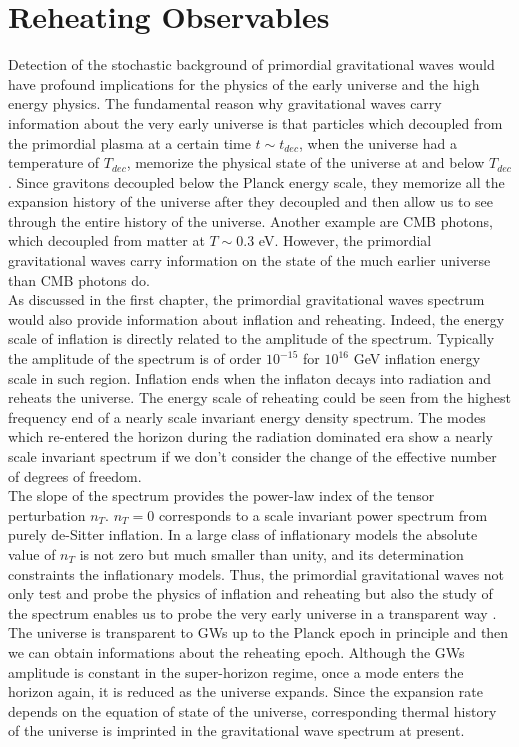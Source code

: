 \documentclass[11pt,a4paper,twoside]{book}
\begin{document}
\chapter{Reheating Observables}
Detection of the stochastic background of primordial gravitational waves would have profound implications for the physics of the early universe and the high energy physics. The fundamental reason why gravitational waves carry information about the very early universe is that particles which decoupled from the primordial plasma at a certain time $ t\sim t_{dec} $, when the universe had a temperature of $ T_{dec} $, memorize the physical state of the universe at and below $ T_{dec} $. Since gravitons decoupled below the Planck energy scale, they memorize all the expansion history of the universe after they decoupled and then allow us to see through the entire history of the universe. Another example are CMB photons, which decoupled from matter at $ T\sim 0.3 $ eV. However, the primordial gravitational waves carry information on the state of the much earlier universe than CMB photons do.\\
As discussed in the first chapter, the primordial gravitational waves spectrum would also provide information about inflation and reheating. Indeed, the energy scale of inflation is directly related to the amplitude of the spectrum. Typically the amplitude of the spectrum is of order $ 10^{-15} $ for $ 10^{16} $ GeV inflation energy scale in such region. Inflation ends when the inflaton decays into radiation and reheats the universe. The energy scale of reheating could be seen from the highest frequency end of a nearly scale invariant energy density spectrum. The modes which re-entered the horizon during the radiation dominated era show a nearly scale invariant spectrum if we don't consider the change of the effective number of degrees of freedom.\\
The slope of the spectrum provides the power-law index of the tensor perturbation $ n_{T} $. $ n_{T}=0 $ corresponds to a scale invariant power spectrum from purely de-Sitter inflation. In a large class of inflationary models the absolute value of $ n_{T} $ is not zero but much smaller than unity, and its determination constraints the inflationary models. Thus, the  primordial gravitational waves not only test and probe the physics of inflation and reheating but also the study of the spectrum enables us to probe the very early universe in a transparent way \cite{Chap3:GW_Watanabe_Komatsu}.\\ 
The universe is transparent to GWs up to the Planck epoch in principle and then we can obtain informations about the reheating epoch. Although the GWs amplitude is constant  in the super-horizon regime, once a mode enters the horizon again, it is reduced as the universe expands. Since the expansion rate depends on the equation of state of the universe, corresponding thermal history of the universe is imprinted in the gravitational wave spectrum at present.\\
\end{document}
